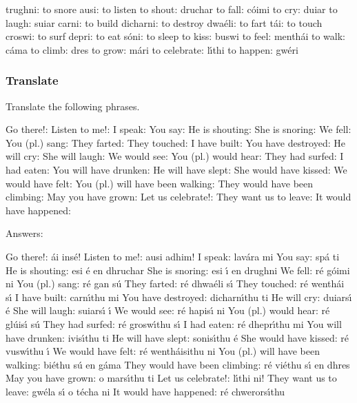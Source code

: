 trughni: to snore
ausi: to listen
to shout: druchar
to fall: c\'{o}imi
to cry: duiar
to laugh: suiar
carni: to build
dicharni: to destroy
dwa\'{e}li: to fart
t\'{a}i: to touch
croswi: to surf
depri: to eat
s\'{o}ni: to sleep
to kiss: buswi
to feel: menth\'{a}i
to walk: c\'{a}ma 
to climb: dres 
to grow: m\'{a}ri 
to celebrate: l\'{\i}thi
to happen: gw\'{e}ri

\subsubsection{Translate}

Translate the following phrases. 

Go there!: 
Listen to me!: 
I speak:
You say:
He is shouting:
She is snoring:
We fell:
You (pl.) sang:
They farted:
They touched:
I have built:
You have destroyed:
He will cry:
She will laugh:
We would see:
You (pl.) would hear:
They had surfed:
I had eaten:
You will have drunken:
He will have slept:
She would have kissed:
We would have felt: 
You (pl.) will have been walking:
They would have been climbing:
May you have grown: 
Let us celebrate!:
They want us to leave:
It would have happened:


Answers:

Go there!: \'{a}i ins\'{e}!
Listen to me!: ausi adhim!
I speak: lav\'{a}ra mi
You say: sp\'{a} ti
He is shouting: esi \'{e} en dhruchar
She is snoring: esi \'{\i} en drughni
We fell: r\'{e} g\'{o}imi ni
You (pl.) sang: r\'{e} gan s\'{u}
They farted: r\'{e} dhwa\'{e}li s\'{\i}
They touched: r\'{e} wenth\'{a}i s\'{\i}
I have built: carn\'{\i}thu mi
You have destroyed: dicharn\'{\i}thu ti
He will cry: duiars\'{\i} \'{e}
She will laugh: suiars\'{\i} \'{\i}
We would see: r\'{e} hapis\'{\i} ni
You (pl.) would hear: r\'{e} gl\'{u}is\'{\i} s\'{u}
They had surfed: r\'{e} grosw\'{\i}thu s\'{\i}
I had eaten: r\'{e} dhepr\'{\i}thu mi
You will have drunken: ivis\'{\i}thu ti
He will have slept: sonis\'{\i}thu \'{e}
She would have kissed: r\'{e} vusw\'{\i}thu \'{\i}
We would have felt: r\'{e} wenth\'{a}isithu ni
You (pl.) will have been walking: bi\'{e}thu s\'{u} en g\'{a}ma
They would have been climbing: r\'{e} vi\'{e}thu s\'{\i} en dhres
May you have grown: o mars\'{\i}thu ti
Let us celebrate!: l\'{\i}thi ni!
They want us to leave: gw\'{e}la s\'{\i} o t\'{e}cha ni
It would have happened: r\'{e} chwerors\'{\i}thu
